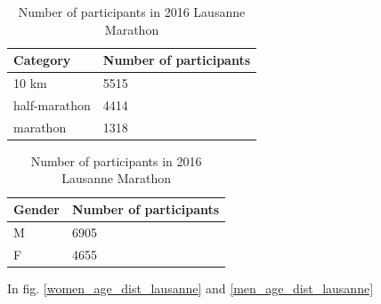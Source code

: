 \documentclass[fleqn,10pt]{wlscirep}
\begin{document}

	 	\begin{table}
	 		\begin{tabular}{l|l}
	 			Category     & Number of participants \\ \hline
	 			10 km         & 5515                   \\
	 			half-marathon & 4414                   \\
	 			marathon      & 1318                   \\
	 		\end{tabular}
 		
 			\begin{tabular}{l|l}
				Gender     		& Number of participants \\ \hline
 				M       	  & 6905 					\\
				F		 		& 4655                   \\
 			\end{tabular}
 		\caption{Number of participants in 2016 Lausanne Marathon}
 		\label{counts_per_distance}
	 	\end{table}
 	
 		In fig. \ref{women_age_dist_lausanne} and \ref{men_age_dist_lausanne}
 		
\end{document}

